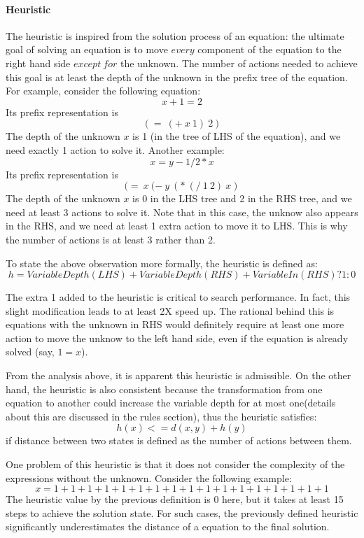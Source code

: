 \documentclass{article}
\begin{document}
\paragraph{Heuristic} The heuristic is inspired from the solution process of an equation: the ultimate goal of solving an equation is to move $every$ component of the equation to the right hand side $except~for$ the unknown. The number of actions needed to achieve this goal is at least the depth of the unknown in the prefix tree of the equation. For example, consider the following equation:
\[ x + 1 = 2 \]
Its prefix representation is 
\[(=~(+~x~1)~2)\]
The depth of the unknown $x$ is 1 (in the tree of LHS of the equation), and we need exactly 1 action to solve it. Another example:
\[ x = y - 1/2*x \]
Its prefix representation is 
\[(=~x~(-~y~(*~(/~1~2)~x)\]
The depth of the unknown $x$ is 0 in the LHS tree and 2 in the RHS tree, and we need at least 3 actions to solve it. Note that in this case, the unknow also appears in the RHS, and we need at least 1 extra action to move it to LHS. This is why the number of actions is at least 3 rather than 2.

To state the above observation more formally, the heuristic is defined as:
\[ h = VariableDepth(LHS) + VariableDepth(RHS) + VariableIn(RHS)?1:0 \]

The extra 1 added to the heuristic is critical to search performance. In fact, this slight modification leads to at least 2X speed up. The rational behind this is equations with the unknown in RHS would definitely require at least one more action to move the unknow to the left hand side, even if the equation is already solved (say, $1=x$). 

From the analysis above, it is apparent this heuristic is admissible. On the other hand, the heuristic is also consistent because the transformation from one equation to another could increase the variable depth for at most one(details about this are discussed in the rules section), thus the heuristic satisfies:
\[ h(x) <= d(x, y) + h(y) \]
if distance between two states is defined as the number of actions between them.

One problem of this heuristic is that it does not consider the complexity of the expressions without the unknown. Consider the following example:
\[ x = 1 + 1 + 1 + 1 + 1 + 1 + 1 + 1 + 1 + 1 + 1 + 1 + 1 + 1 + 1 + 1 + 1 \]
The heuristic value by the previous definition is 0 here, but it takes at least 15 steps to achieve the solution state. For such cases, the previously defined heuristic significantly underestimates the distance of a equation to the final solution. 
\end{document}
